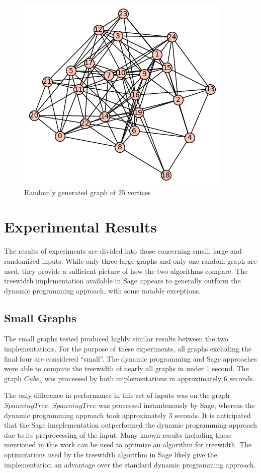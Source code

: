 \documentclass[12pt,conference]{IEEEtran}
\theoremstyle{plain}
\begin{document}
\begin{figure}
\caption{Randomly generated graph of 25 vertices}
\centering
\includegraphics[scale=0.75]{random-25}
\end{figure}

\section{Experimental Results}

The results of experiments are divided into those concerning small, large and randomized inputs. While only three large graphs and only one random graph are used, they provide a sufficient picture of how the two algorithms compare. The treewidth implementation available in Sage appears to generally outform the dynamic programming approach, with some notable exceptions.

\subsection{Small Graphs}

The small graphs tested produced highly similar results between the two implementations. For the purpose of these experiments, all graphs excluding the final four are considered ``small''. The dynamic programming and Sage approaches were able to compute the treewidth of nearly all graphs in under 1 second. The graph $Cube_{4}$ was processed by both implementations in approximately 6 seconds. 

The only difference in performance in this set of inputs was on the graph $Spanning Tree$. $Spanning Tree$ was processed instantenously by Sage, whereas the dynamic programming approach took approximately 3 seconds. It is anticipated that the Sage imeplementation outperformed the dynamic programming approach due to its preprocessing of the input. Many known results including those mentioned in this work can be used to optimize an algorithm for treewidth. The optimizations used by the treewidth algorithm in Sage likely give the implementation an advantage over the standard dynamic programming approach.
\end{document}
